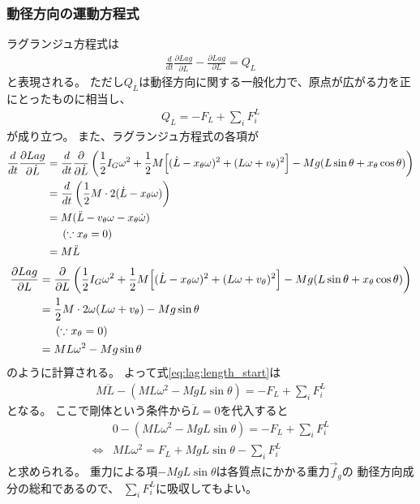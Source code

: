 \documentclass[a4paper,11pt]{jsarticle}
\begin{document}
\subsubsection*{動径方向の運動方程式}
ラグランジュ方程式は
\begin{align}
  \frac{d}{dt}\frac{\partial Lag}{\partial \dot{L}} - \frac{\partial Lag}{\partial L} = Q_L
  \label{eq:lag:length_start}
\end{align}
と表現される。
ただし$Q_L$は動径方向に関する一般化力で、原点が広がる力を正にとったものに相当し、
\begin{align}
  Q_L = -F_L +  \sum_i F_i^L
\end{align}
が成り立つ。
また、ラグランジュ方程式の各項が
\begin{align}
  \frac{d}{dt}\frac{\partial Lag}{\partial \dot{L}}
  &= \frac{d}{dt}\frac{\partial }{\partial \dot{L}}
  \left(
    \frac{1}{2}I_G\omega^2
    + \frac{1}{2}M
    \Bigl[ (\dot{L} - x_\theta \omega)^2 + (L\omega + v_\theta)^2 \Bigr]
    - Mg ( L\sin\theta + x_\theta \cos\theta )
  \right)
  \\
  & = \frac{d}{dt}\left( \frac{1}{2}M \cdot 2(\dot{L} - x_\theta \omega)\right)
  \\
  &= M( \ddot{L} - v_\theta \omega - x_\theta \dot\omega )
  \\
  & \ \ \ \ \left( \because x_\theta = 0 \right)
  \\
  &= M \ddot{L}
\end{align}
\begin{align}
  \frac{\partial Lag}{\partial L}
  &= \frac{\partial }{\partial L}
  \left(
    \frac{1}{2}I_G\omega^2
    + \frac{1}{2}M
    \Bigl[ (\dot{L} - x_\theta \omega)^2 + (L\omega + v_\theta)^2 \Bigr]
    - Mg ( L\sin\theta + x_\theta \cos\theta )
  \right)
  \\
  &= \frac{1}{2}M \cdot 2\omega(L\omega + v_\theta) - Mg\sin\theta
  \\
  & \ \ \ \ \left( \because x_\theta = 0 \right)
  \\
  &= ML\omega^2 - Mg\sin\theta
\end{align}
のように計算される。
よって式\ref{eq:lag:length_start}は
\begin{align}
  M\ddot{L} - ( ML\omega^2 - MgL\sin\theta ) = -F_L + \sum_i F_i^L
\end{align}
となる。
ここで剛体という条件から$\ddot{L} = 0$を代入すると
\begin{align}
  & 0 - ( ML\omega^2 - MgL\sin\theta ) = -F_L + \sum_i F_i^L
  \\
  \Leftrightarrow
  & ML\omega^2 = F_L + MgL\sin\theta - \sum_i F_i^L
  \label{eq:lag:length_end}
\end{align}
と求められる。
重力による項$-MgL\sin\theta$は各質点にかかる重力$\vec{f}_g$の
動径方向成分の総和であるので、
$\sum_i F_i^L$に吸収してもよい。
\end{document}

